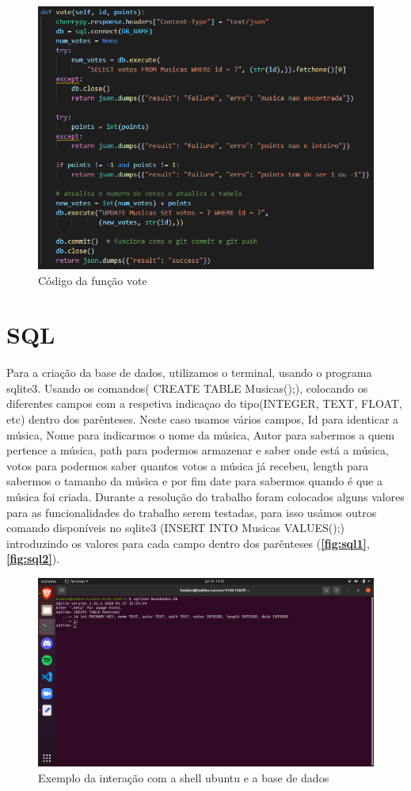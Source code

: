 \documentclass{report}
\begin{document}
\begin{figure}[!h]
\center 
\includegraphics[width=330pt]{img/vote.png}
\caption{Código da função vote}
\label{fig:vote}
\end{figure}

\section{SQL}
\label{sec:sql}
Para a criação da base de dados, utilizamos o terminal, usando o programa sqlite3.
Usando os comandos( CREATE TABLE Musicas();), colocando os diferentes campos com a 
respetiva indicaçao do tipo(INTEGER, TEXT, FLOAT, etc) dentro dos parênteses.
Neste caso usamos vários campos, Id para identicar a música, Nome para indicarmos 
o nome da música, Autor para sabermos a quem pertence a música, path para podermos 
armazenar e saber onde está a música, votos para podermos saber quantos votos a 
música já recebeu, length para sabermos o tamanho da música e por fim date para 
sabermos quando é que a música foi criada.
Durante a resolução do trabalho foram colocados alguns valores para as funcionalidades 
do trabalho serem testadas, para isso usámos outros comando disponíveis no sqlite3 
(INSERT INTO Musicas VALUES();) introduzindo os valores para cada campo dentro dos 
parênteses (\textbf{\autoref{fig:sql1}}, \textbf{\autoref{fig:sql2}}).

\begin{figure}[!h]
\center 
\includegraphics[width=330pt]{img/sql_1.png}
\caption{Exemplo da interação com a shell ubuntu e a base de dados}
\label{fig:sql1}
\end{figure}
\end{document}
